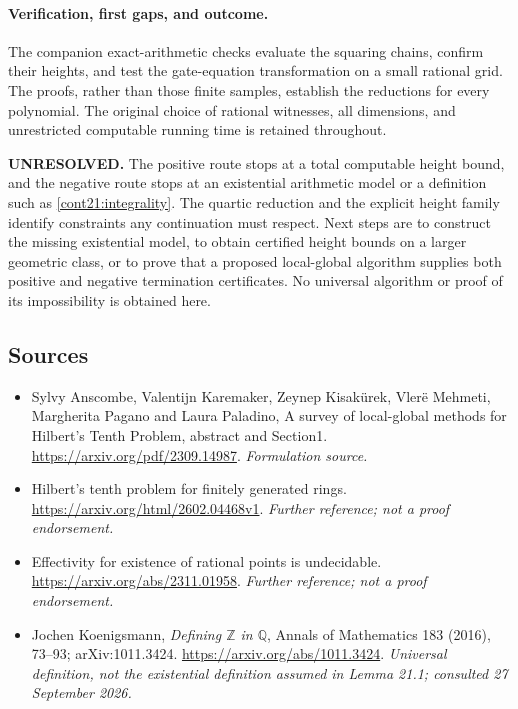 \documentclass[11pt]{article}
\begin{document}
\paragraph{Verification, first gaps, and outcome.}
The companion exact-arithmetic checks evaluate the squaring chains,
confirm their heights, and test the gate-equation transformation on a
small rational grid. The proofs, rather than those finite samples,
establish the reductions for every polynomial. The original choice of
rational witnesses, all dimensions, and unrestricted computable running
time is retained throughout.

\textbf{UNRESOLVED.} The positive route stops at a total computable height
bound, and the negative route stops at an existential arithmetic model
or a definition such as \eqref{cont21:integrality}. The quartic reduction
and the explicit height family identify constraints any continuation
must respect. Next steps are to construct the missing existential model,
to obtain certified height bounds on a larger geometric class, or to
prove that a proposed local-global algorithm supplies both positive and
negative termination certificates. No universal algorithm or proof of
its impossibility is obtained here.

\subsection{Sources}
\begin{itemize}
\item[S1]Sylvy Anscombe, Valentijn Karemaker, Zeynep Kisakürek, Vlerë Mehmeti, Margherita Pagano and Laura Paladino, A survey of local-global methods for Hilbert's Tenth Problem, abstract and Section1.
\url{https://arxiv.org/pdf/2309.14987}.
\textit{Formulation source.}
\item[S2]Hilbert's tenth problem for finitely generated rings.
\url{https://arxiv.org/html/2602.04468v1}.
\textit{Further reference; not a proof endorsement.}
\item[S3]Effectivity for existence of rational points is undecidable.
\url{https://arxiv.org/abs/2311.01958}.
\textit{Further reference; not a proof endorsement.}
\item[E1]Jochen Koenigsmann, \emph{Defining $\mathbb Z$ in $\mathbb Q$},
Annals of Mathematics 183 (2016), 73--93; arXiv:1011.3424.
\url{https://arxiv.org/abs/1011.3424}.
\textit{Universal definition, not the existential definition assumed in
Lemma 21.1; consulted 27 September 2026.}
\end{itemize}
\end{document}
